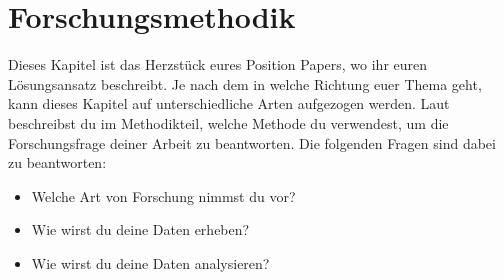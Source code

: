 

\chapter{Forschungsmethodik}\label{cha:methodologicalApproach}

Dieses Kapitel ist das Herzstück eures Position Papers, wo ihr euren Lösungsansatz beschreibt. Je nach dem in welche
Richtung euer Thema geht, kann dieses Kapitel auf unterschiedliche Arten aufgezogen werden. Laut \textcite{pfeiffer2018}  beschreibst du im Methodikteil, welche Methode du verwendest, um die Forschungsfrage deiner Arbeit zu beantworten. Die folgenden Fragen sind dabei zu beantworten:

\begin{itemize}
    \item Welche Art von Forschung nimmst du vor?
    \item Wie wirst du deine Daten erheben?
    \item Wie wirst du deine Daten analysieren?
\end{itemize}

